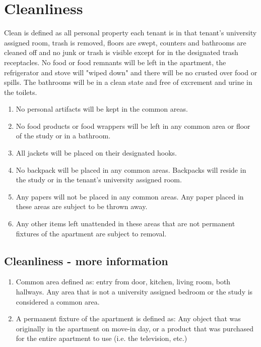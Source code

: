 \documentclass[10pt]{article}
\begin{document}
\section{Cleanliness}
Clean is defined as all personal property each tenant is in that tenant’s university assigned room, trash is removed, floors are swept, counters and bathrooms are cleaned off and no junk or trash is visible except for in the designated trash receptacles. No food or food remnants will be left in the apartment, the refrigerator and stove will "wiped down" and there will be no crusted over food or spills. The bathrooms will be in a clean state and free of excrement and urine in the toilets.
\begin{enumerate}
	\item No personal artifacts will be kept in the common areas.
	\item No food products or food wrappers will be left in any common area or floor of the study or in a bathroom.
	\item All jackets will be placed on their designated hooks.
	\item No backpack will be placed in any common areas. Backpacks will reside in the study or in the tenant’s university assigned room.
	\item Any papers will not be placed in any common areas. Any paper placed in these areas are subject to be thrown away.
	\item Any other items left unattended in these areas that are not permanent fixtures of the apartment are subject to removal.
	
\end{enumerate}
\subsection{Cleanliness - more information}
\begin{enumerate}
	\item Common area defined as: entry from door, kitchen, living room, both hallways. Any area that is not a university assigned bedroom or the study is considered a common area.
	\item A permanent fixture of the apartment is defined as: Any object that was originally in the apartment on move-in day, or a product that was purchased for the entire apartment to use (i.e. the television, etc.)
\end{enumerate}
\end{document}
